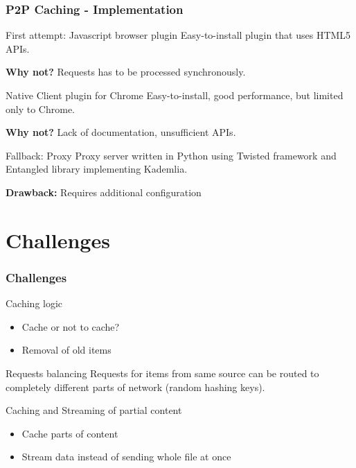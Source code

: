\documentclass{beamer}
\begin{document}
\begin{frame}
\frametitle{P2P Caching - Implementation}

\begin{block}{First attempt: Javascript browser plugin}
Easy-to-install plugin that uses HTML5 APIs.

\textbf{Why not?} Requests has to be processed synchronously. 
\end{block}

\pause
\begin{block}{Native Client plugin for Chrome}
Easy-to-install, good performance, but limited only to Chrome.

\textbf{Why not?} Lack of documentation, unsufficient APIs.
\end{block}

\pause
\begin{block}{Fallback: Proxy \cite{guha2002improving}}
Proxy server written in Python using Twisted framework and Entangled library implementing Kademlia.

\textbf{Drawback:} Requires additional configuration
\end{block}

\end{frame}

\section{Challenges}
\begin{frame}
\frametitle{Challenges}

\begin{block}{Caching logic}
\begin{itemize}
  \item Cache or not to cache?
  \item Removal of old items 
\end{itemize}
\end{block}

\begin{block}{Requests balancing}
Requests for items from same source can be routed to completely different 
parts of network (random hashing keys).
\end{block}

\begin{block}{Caching and Streaming of partial content}
\begin{itemize}
  \item Cache parts of content
  \item Stream data instead of sending whole file at once
\end{itemize}
\end{block}

\end{frame}
\end{document}
